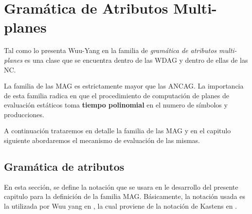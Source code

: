 \chapter{Gramática de Atributos Multi-planes}
\label{chap:mag}
\minitoc

Tal como lo presenta Wuu-Yang en \cite{wuu-yang1} la familia de \textit{gramática de atributos multi-planes} es una clase que se encuentra dentro de las WDAG y dentro de ellas de las NC.

La familia de las MAG es estrictamente mayor que las ANCAG. La importancia de esta familia radica en que el procedimiento de computación de planes de evaluación estáticos toma \textbf{tiempo polinomial} en el numero de símbolos y producciones.

A continuación trataremos en detalle la familia de las MAG y en el capitulo siguiente abordaremos el mecanismo de evaluación de las mismas.


\section{Gramática de atributos}
En esta sección, se define la notación que se usara en le desarrollo del presente capitulo para la definición de la familia MAG.
Básicamente, la notación usada es la utilizada por Wuu yang en \cite{wuu-yang1}, la cual proviene de la notación de Kastens en \cite{kastens}.

